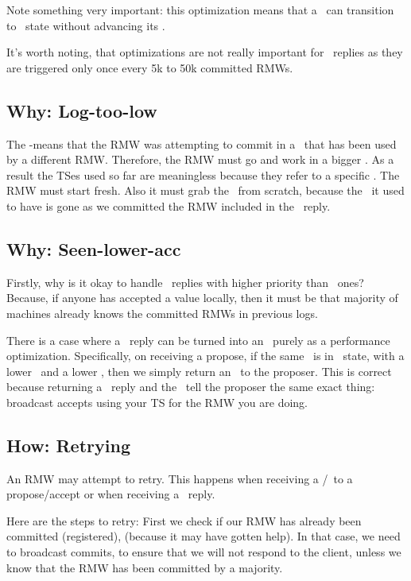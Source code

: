 Note something very important: this optimization means that a \kv~can transition to \invalid~state without advancing its \comlogno.


\custvspace
It's worth noting, that optimizations are not really important for \alreadycom~replies as they are  triggered only once every 5k to 50k committed RMWs. 

\subsection{Why: Log-too-low} \label{sec:why:loglow}

The \loglow-means that the RMW was attempting to commit in a \logno~that has been used by a different RMW. Therefore, the RMW must go and work in a bigger \logno. As a result the TSes used so far are meaningless because they refer to a specific \logno. The RMW must start fresh. Also it must grab the \kv~from scratch, because the \logno~it used to have is gone as we committed the RMW included in the \loglow~reply.

\subsection{Why: Seen-lower-acc} \label{sec:why:lowacc}

Firstly, why is it okay to handle \lowacc~replies with higher priority than \loghigh~ones?
Because, if anyone has accepted a value locally, then it must be that majority of machines already knows the committed RMWs in previous logs.

There is a case where a \lowacc~reply can be turned into an \ack~purely as a performance optimization.
Specifically, on receiving a propose, if the same \rmw~is in \acced~state, with a lower \propts~and a lower \accts, then we simply return an \ack~to the proposer. This is correct because returning a \lowacc~reply and the \ack~tell the proposer the same exact thing: broadcast accepts using your TS for the RMW you are doing.


\subsection{How: Retrying} \label{sec:how:retry}

An RMW may attempt to retry. This happens when receiving a \highprop/\highacc~to a propose/accept or when receiving a \loghigh~reply.

Here are the steps to retry:
First we check if our RMW has already been committed (\ie registered), (because it may have gotten help). In that case, we need to broadcast commits, to ensure that we will not respond to the client, unless we know that the RMW has been committed by a majority.

